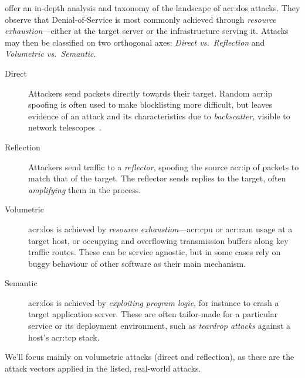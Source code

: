 \Textcite{DBLP:conf/imc/JonkerKKRSD17} offer an in-depth analysis and taxonomy of the landscape of \gls{acr:dos} attacks.
They observe that Denial-of-Service is most commonly achieved through \emph{resource exhaustion}---either at the target server or the infrastructure serving it.
Attacks may then be classified on two orthogonal axes: \emph{Direct vs.~Reflection} and \emph{Volumetric vs.~Semantic}.
\begin{description}
	\item[Direct] Attackers send packets directly towards their target. Random \gls{acr:ip} spoofing is often used to make blocklisting more difficult, but leaves evidence of an attack and its characteristics due to \emph{backscatter}, visible to network telescopes~\parencite{DBLP:conf/lisa/Moore03,DBLP:conf/imc/RichterB19}.
	\item[Reflection] Attackers send traffic to a \emph{reflector}, spoofing the source \gls{acr:ip} of packets to match that of the target. The reflector sends replies to the target, often \emph{amplifying} them in the process.
	\item[Volumetric] \gls{acr:dos} is achieved by \emph{resource exhaustion}---\gls{acr:cpu} or \gls{acr:ram} usage at a target host, or occupying and overflowing transmission buffers along key traffic routes. These can be service agnostic, but in some cases rely on buggy behaviour of other software as their main mechanism.
	\item[Semantic] \gls{acr:dos} is achieved by \emph{exploiting program logic}, for instance to crash a target application server. These are often tailor-made for a particular service or its deployment environment, such as \emph{teardrop attacks} against a host's \gls{acr:tcp} stack.
\end{description}
We'll focus mainly on volumetric attacks (direct and reflection), as these are the attack vectors applied in the listed, real-world attacks.


